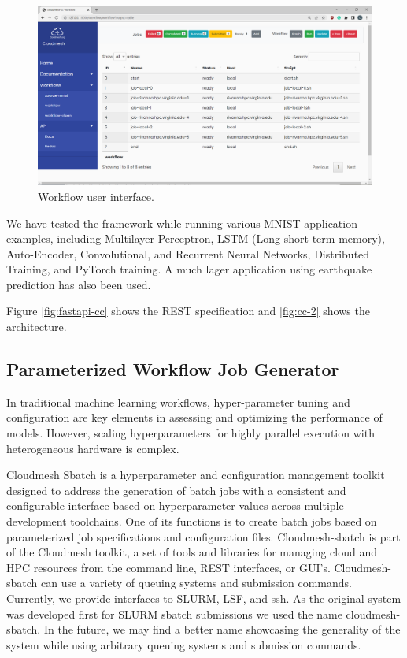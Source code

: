 \documentclass[utf8]{FrontiersinVancouver} %
\begin{document}
\begin{figure}[htb]
    \centering
    \includegraphics[width=0.70\columnwidth]{images/cc-1.png}
    \caption{Workflow user interface.}
    \label{fig:cc-3}
\end{figure}


We have tested the framework while running various MNIST application
examples, including Multilayer Perceptron, LSTM (Long short-term
memory), Auto-Encoder, Convolutional, and Recurrent Neural Networks,
Distributed Training, and PyTorch training.  A much lager application
using earthquake prediction has also been used.

Figure \ref{fig:fastapi-cc} shows the REST specification and
\ref{fig:cc-2} shows the architecture.

\subsection{Parameterized Workflow Job Generator}
\label{sec:workflow-sbatch}

In traditional machine learning workflows, hyper-parameter tuning and
configuration are key elements in assessing and optimizing the
performance of models. However, scaling hyperparameters for highly
parallel execution with heterogeneous hardware is complex.

Cloudmesh Sbatch is a hyperparameter and configuration management
toolkit designed to address the generation of batch jobs with a
consistent and configurable interface based on hyperparameter values
across multiple development toolchains. One of its functions is to
create batch jobs based on parameterized job specifications and
configuration files.  Cloudmesh-sbatch is part of the Cloudmesh
toolkit, a set of tools and libraries for managing cloud and HPC
resources from the command line, REST interfaces, or GUI's.
Cloudmesh-sbatch can use a variety of
queuing systems and submission commands. Currently, we provide
interfaces to SLURM, LSF, and ssh. As the original system was
developed first for SLURM sbatch submissions we used the name
cloudmesh-sbatch. In the future, we may find a better name showcasing the
generality of the system while using arbitrary queuing systems and
submission commands.
\end{document}
